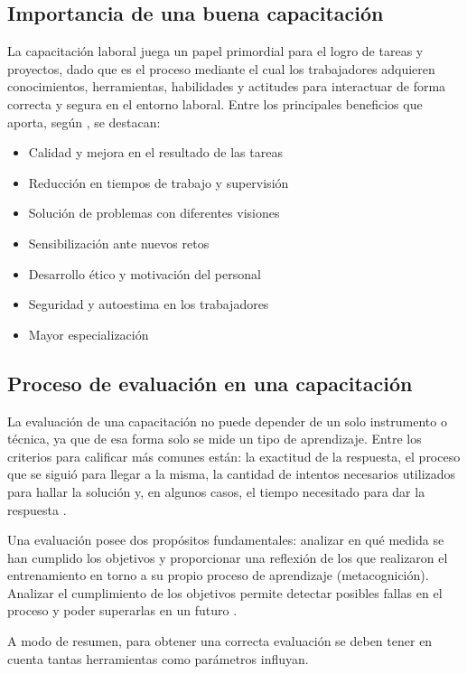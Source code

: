 \subsection{Importancia de una buena capacitación}
La capacitación laboral juega un papel primordial para el logro de tareas y proyectos, dado que es el proceso mediante el cual los trabajadores adquieren conocimientos, herramientas, habilidades y actitudes para interactuar de forma correcta y segura en el entorno laboral. Entre los principales beneficios que aporta, según \cite{RogelioE.Martinez2002}, se destacan:

\begin{itemize}
\item Calidad y mejora en el resultado de las tareas
\item Reducción en tiempos de trabajo y supervisión
\item Solución de problemas con diferentes visiones
\item Sensibilización ante nuevos retos
\item Desarrollo ético y motivación del personal
\item Seguridad y autoestima en los trabajadores
\item Mayor especialización
\end{itemize}

\subsection{Proceso de evaluación en una capacitación}
La evaluación de una capacitación no puede depender de un solo instrumento o técnica, ya que de esa forma solo se mide un tipo de aprendizaje. Entre los criterios para calificar más comunes están: la exactitud de la respuesta, el proceso que se siguió para llegar a la misma, la cantidad de intentos necesarios utilizados para hallar la solución y, en algunos casos, el tiempo necesitado para dar la respuesta \cite{Jacobs2012}.

Una evaluación posee dos propósitos fundamentales: analizar en qué medida se han cumplido los objetivos y proporcionar una reflexión de los que realizaron el entrenamiento en torno a su propio proceso de aprendizaje (metacognición). Analizar el cumplimiento de los objetivos permite detectar posibles fallas en el proceso y poder superarlas en un futuro \cite{Aretio2020}.

A modo de resumen, para obtener una correcta evaluación se deben tener en cuenta tantas herramientas como parámetros influyan.

